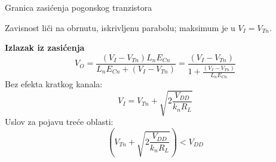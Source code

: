 \begin{frame}[label=09_1-s014]{Granica zasićenja pogonskog tranzistora}\setlength{\parskip}{2pt}\setlength{\abovedisplayskip}{4pt}\setlength{\belowdisplayskip}{4pt}\setlength{\abovedisplayshortskip}{3pt}\setlength{\belowdisplayshortskip}{3pt}

Zavisnost liči na obrnutu, iskrivljenu parabolu; maksimum je u $V_I=V_{Tn}$.\par\medskip\textbf{Izlazak iz zasićenja}\[V_O=\frac{(V_I-V_{Tn})L_nE_{Cn}}{L_nE_{Cn}+(V_I-V_{Tn})}=\frac{(V_I-V_{Tn})}{1+\frac{(V_I-V_{Tn})}{L_nE_{Cn}}}\]
\medskip Bez efekta kratkog kanala:\[V_I=V_{Tn}+\sqrt{2\frac{V_{DD}}{k_nR_L}}\]
Uslov za pojavu treće oblasti:\[\left(V_{Tn}+\sqrt{2\frac{V_{DD}}{k_nR_L}}\right)<V_{DD}\]

\end{frame}
